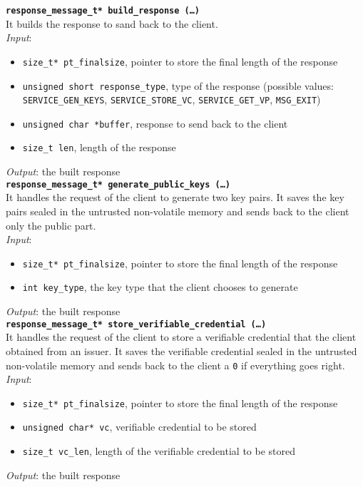 \noindent
\texttt{\bfseries response\_message\_t* build\_response (\dots)}\\
It builds the response to sand back to the client. \\
\textit{Input}:
\begin{itemize}[noitemsep,nolistsep]
\item \texttt{size\_t* pt\_finalsize}, pointer to store the final length of the response
\item \texttt{unsigned short response\_type}, type of the response (possible values: \texttt{SERVICE\_\-GEN\_KEYS}, \texttt{SERVICE\_STORE\_VC}, \texttt{SERVICE\_GET\_VP}, \texttt{MSG\_EXIT})
\item \texttt{unsigned char *buffer}, response to send back to the client
\item \texttt{size\_t len}, length of the response
\end{itemize}
\textit{Output}: the built response \\


\noindent
\texttt{\bfseries response\_message\_t* generate\_public\_keys (\dots)}\\
It handles the request of the client to generate two key pairs. It saves the key pairs sealed in the untrusted non-volatile memory and sends back to the client only the public part. \\ 
\textit{Input}:
\begin{itemize}[noitemsep,nolistsep]
\item \texttt{size\_t* pt\_finalsize}, pointer to store the final length of the response
\item \texttt{int key\_type}, the key type that the client chooses to generate 
\end{itemize}
\textit{Output}: the built response \\

\noindent
\texttt{\bfseries response\_message\_t* store\_verifiable\_credential (\dots)}\\
It handles the request of the client to store a verifiable credential that the client obtained from an issuer. It saves the verifiable credential sealed in the untrusted non-volatile memory and sends back to the client a \texttt{0} if everything goes right. \\
\textit{Input}:
\begin{itemize}[noitemsep,nolistsep]
  \item \texttt{size\_t* pt\_finalsize}, pointer to store the final length of the response
  \item \texttt{unsigned char* vc}, verifiable credential to be stored
  \item \texttt{size\_t vc\_len}, length of the verifiable credential to be stored
\end{itemize}
\textit{Output}: the built response \\

